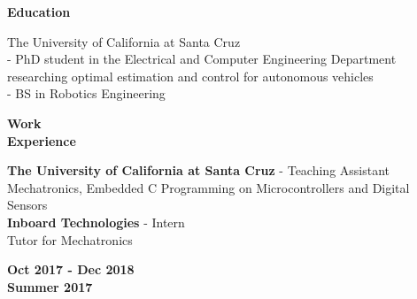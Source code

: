 \documentclass[paper=a4,fontsize=11pt]{article} %
\def \sectionSpace      {0.3cm}     %
\def \leftColSpace      {0.125}     %
\def \middleColSpace    {0.75}      %
\def \bigMiddleColSpace {0}         %
\def \rightColSpace     {0.175}     %
\begin{document}
\vspace{\sectionSpace}
\noindent
\begin{minipage}[t]{\leftColSpace\linewidth}
\begin{flushleft}
\noindent \textbf{Education}\\
\end{flushleft}
\end{minipage}
\begin{minipage}[t]{\bigMiddleColSpace\linewidth}
\begin{flushleft}
\noindent The University of California at Santa Cruz\\
 - PhD student in the Electrical and Computer Engineering Department researching optimal estimation and control for autonomous vehicles\\
 - BS in Robotics Engineering\\
\end{flushleft}
\end{minipage}

\vspace{\sectionSpace}
\noindent
\begin{minipage}[t]{\leftColSpace\linewidth}
\begin{flushleft}
\noindent \textbf{Work\\Experience}\\
\end{flushleft}
\end{minipage}
\begin{minipage}[t]{\middleColSpace\linewidth}
\begin{flushleft}
\noindent \textbf{The University of California at Santa Cruz} - Teaching Assistant\\
\noindent Mechatronics, Embedded C Programming on Microcontrollers and Digital Sensors\\
\noindent \textbf{Inboard Technologies} - Intern \hfill \\
\noindent Tutor for Mechatronics\\
\end{flushleft}
\end{minipage}
\begin{minipage}[t]{\rightColSpace\linewidth}
\begin{flushleft}
\noindent \textbf{Oct 2017 - Dec 2018}
\\[2\baselineskip]
\noindent \textbf{Summer 2017}
\end{flushleft}
\end{minipage}
\end{document}
